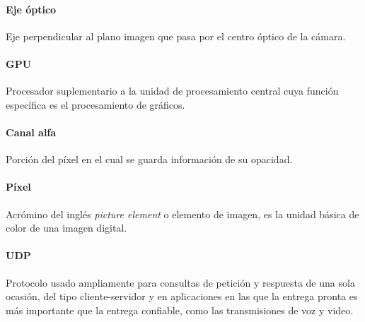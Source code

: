 \paragraph{Eje óptico}
Eje perpendicular al plano imagen que pasa por el centro óptico de la cámara.

\paragraph{GPU}
Procesador suplementario a la unidad de procesamiento central cuya función específica es el procesamiento de gráficos.

\paragraph{Canal alfa}
Porción del píxel en el cual se guarda información de su opacidad.

\paragraph{Píxel}
Acrómino del inglés \emph{picture element} o elemento de imagen, es la unidad básica de color de una imagen digital.

\paragraph{UDP}
Protocolo usado ampliamente para consultas de petición y respuesta de una sola ocasión, del tipo cliente-servidor y en aplicaciones en las que la entrega pronta es más importante que la entrega confiable, como las transmisiones de voz y video.
